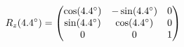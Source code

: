 \documentclass[preview]{standalone}
\begin{document}
\begin{align*}
\special{dvisvgm:raw <g id='unique000'>}R_z(4.4^\circ) = \begin{pmatrix} \cos(4.4^\circ) & -\sin(4.4^\circ) & 0 \\ \sin(4.4^\circ) & \cos(4.4^\circ) & 0 \\ 0 & 0 & 1 \end{pmatrix}\special{dvisvgm:raw </g>}
\end{align*}
\end{document}
